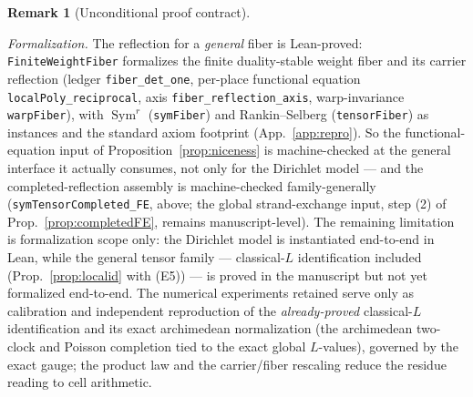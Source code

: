 \documentclass[11pt]{article}
\newcommand{\inst}[1]{%
\samnote{INSTRUCTION: #1}%
}
\theoremstyle{definition}
\newtheorem{remark}[theorem]{Remark}
\newcommand{\Sym}{\operatorname{Sym}}
\begin{document}
\begin{remark}[Unconditional proof contract]
\begin{enumerate}
\emph{Formalization.} The reflection for a \emph{general} fiber is Lean-proved: \texttt{FiniteWeightFiber}
formalizes the finite duality-stable weight fiber and its
carrier reflection (ledger \texttt{fiber\_det\_one}, per-place functional equation
\texttt{localPoly\_reciprocal}, axis \texttt{fiber\_reflection\_axis}, warp-invariance
\texttt{warpFiber}), with $\Sym^r$ (\texttt{symFiber}) and Rankin--Selberg (\texttt{tensorFiber}) as
instances and the standard axiom footprint (App.~\ref{app:repro}).  So the functional-equation input of
Proposition~\ref{prop:niceness} is machine-checked at the general interface it actually consumes, not
only for the Dirichlet model --- and the completed-reflection assembly is machine-checked family-generally
(\texttt{symTensorCompleted\_FE}, above; the global strand-exchange input, step (2) of
Prop.~\ref{prop:completedFE}, remains manuscript-level).  The remaining limitation is formalization scope only: the
Dirichlet model is instantiated end-to-end in Lean, while the general tensor family --- classical-$L$
identification included (Prop.~\ref{prop:localid} with \textup{(E5)}) --- is proved in the manuscript but not yet
formalized end-to-end.  The numerical experiments retained serve only as calibration and independent reproduction
of the \emph{already-proved} classical-$L$ identification and its exact archimedean normalization (the archimedean
two-clock and Poisson completion tied to the exact global $L$-values), governed by the exact gauge; the product law
and the carrier/fiber rescaling reduce the residue reading to cell arithmetic.\inst{tighten}


\end{enumerate}
\end{remark}
\end{document}
